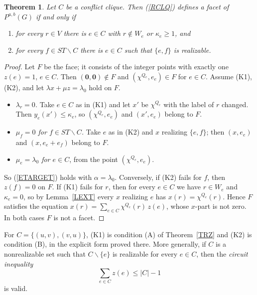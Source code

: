 \documentclass[a4paper,11pt]{article}
\newtheorem{thm}{Theorem}
\theoremstyle{definition}
\begin{document}
\begin{thm} \label{TCLQ}
Let $C$ be a conflict clique. Then (\ref{RCLQ}) defines a facet of $P^{a,b}(G)$ if and only if
\begin{enumerate}
\item[(K1)] for every $r \in V$ there is $e \in C$ with $r \notin W_e$ or $\kappa_e \geq 1$, and
\item[(K2)] for every $f \in ST \backslash C$ there is $e \in C$ such that $\{e,f\}$ is realizable.
\end{enumerate}
\end{thm}
\begin{proof}
Let $F$ be the face; it consists of the integer points with exactly one $z(e) = 1$, $e \in C$. Then $(\mathbf{0},\mathbf{0}) \notin F$ and
$(\chi^{Q_e}, e_e) \in F$ for $e \in C$. Assume (K1), (K2), and let $\lambda x + \mu z = \lambda_0$ hold on $F$.
\begin{itemize}
\item \emph{$\lambda_r = 0$.} Take $e \in C$ as in (K1) and let $x'$ be $\chi^{Q_e}$ with the label of $r$ changed. Then $y_e(x') \leq \kappa_e$, so
$(\chi^{Q_e}, e_e)$ and $(x', e_e)$ belong to $F$.
\item \emph{$\mu_f = 0$ for $f \in ST \backslash C$.} Take $e$ as in (K2) and $x$ realizing $\{e,f\}$; then $(x, e_e)$ and $(x, e_e + e_f)$ belong
to $F$.
\item \emph{$\mu_e = \lambda_0$ for $e \in C$}, from the point $(\chi^{Q_e}, e_e)$.
\end{itemize}
So (\ref{ETARGET}) holds with $\alpha = \lambda_0$. Conversely, if (K2) fails for $f$, then $z(f) = 0$ on $F$. If (K1) fails for $r$, then for every
$e \in C$ we have $r \in W_e$ and $\kappa_e = 0$, so by Lemma~\ref{LEXT} every $x$ realizing $e$ has $x(r) = \chi^{Q_e}(r)$. Hence $F$ satisfies the equation
$x(r) = \sum_{e \in C} \chi^{Q_e}(r)\, z(e)$, whose $x$-part is not zero. In both cases $F$ is not a facet.
\end{proof}

For $C = \{(u,v),(v,u)\}$, (K1) is condition (A) of Theorem~\ref{TRZ} and (K2) is condition (B), in the explicit form proved there.
More generally, if $C$ is a nonrealizable set such that $C \backslash \{e\}$ is realizable for every $e \in C$, then the \emph{circuit inequality}
\begin{equation} \label{RCIRC}
\sum_{e \in C} z(e) \leq |C| - 1
\end{equation}
is valid.
\end{document}
